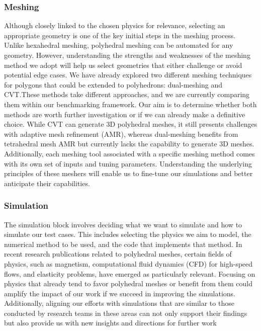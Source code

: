 \documentclass{article}
\begin{document}
\subsubsection{Meshing}
Although closely linked to the chosen physics for relevance, selecting an appropriate geometry is one of the key initial steps in the meshing process. Unlike hexahedral meshing, polyhedral meshing can be automated for any geometry. However, understanding the strengths and weaknesses of the meshing method we adopt will help us select geometries that either challenge or avoid potential edge cases. We have already explored two different meshing techniques for polygons that could be extended to polyhedrons: dual-meshing and CVT.\@ These methods take different approaches, and we are currently comparing them within our benchmarking framework. Our aim is to determine whether both methods are worth further investigation or if we can already make a definitive choice. While CVT can generate 3D polyhedral meshes, it still presents challenges with adaptive mesh refinement (AMR), whereas dual-meshing benefits from tetrahedral mesh AMR but currently lacks the capability to generate 3D meshes. Additionally, each meshing tool associated with a specific meshing method comes with its own set of inputs and tuning parameters. Understanding the underlying principles of these meshers will enable us to fine-tune our simulations and better anticipate their capabilities.

\subsubsection{Simulation}
The simulation block involves deciding what we want to simulate and how to simulate our test cases. This includes selecting the physics we aim to model, the numerical method to be used, and the code that implements that method. In recent research publications related to polyhedral meshes, certain fields of physics, such as magnetism, computational fluid dynamics (CFD) for high-speed flows, and elasticity problems, have emerged as particularly relevant. Focusing on physics that already tend to favor polyhedral meshes or benefit from them could amplify the impact of our work if we succeed in improving the simulations. Additionally, aligning our efforts with simulations that are similar to those conducted by research teams in these areas can not only support their findings but also provide us with new insights and directions for further work
\end{document}
